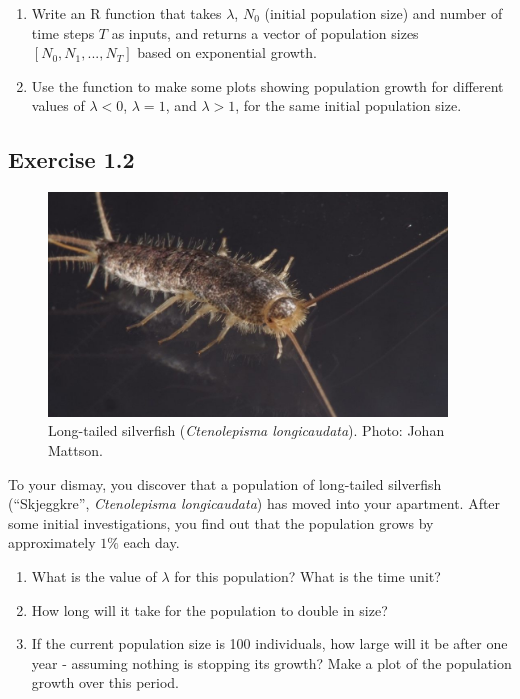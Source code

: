\documentclass[
]{book}
\begin{document}
\begin{enumerate}
\def\labelenumi{\arabic{enumi}.}
\item
  Write an R function that takes \(\lambda\), \(N_0\) (initial population size) and number of time steps \(T\) as inputs, and returns a vector of population sizes \([N_0, N_1, ..., N_T]\) based on exponential growth.
\item
  Use the function to make some plots showing population growth for different values of \(\lambda<0\), \(\lambda=1\), and \(\lambda>1\), for the same initial population size.
\end{enumerate}

\hypertarget{exercise-1.2}{%
\subsection*{Exercise 1.2}\label{exercise-1.2}}

\begin{figure}
\centering
\includegraphics[width=4.16667in,height=\textheight]{skjeggkre.jpg}
\caption{Long-tailed silverfish (\emph{Ctenolepisma longicaudata}). Photo: Johan Mattson.}
\end{figure}

To your dismay, you discover that a population of long-tailed silverfish (``Skjeggkre'', \emph{Ctenolepisma longicaudata}) has moved into your apartment. After some initial investigations, you find out that the population grows by approximately \(1\%\) each day.

\begin{enumerate}
\def\labelenumi{\arabic{enumi}.}
\item
  What is the value of \(\lambda\) for this population? What is the time unit?
\item
  How long will it take for the population to double in size?
\item
  If the current population size is 100 individuals, how large will it be after one year - assuming nothing is stopping its growth? Make a plot of the population growth over this period.
\end{enumerate}
\end{document}
